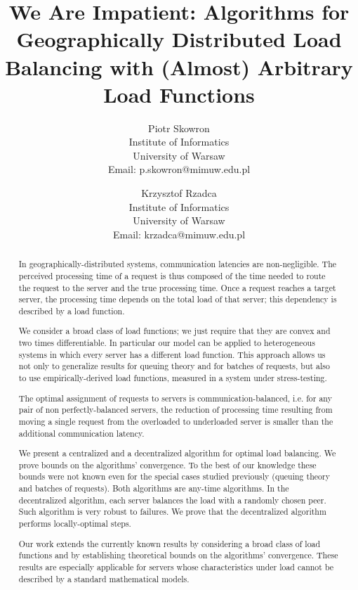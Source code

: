 \documentclass[11pt]{article}
\begin{document}
\title{We Are Impatient: Algorithms for Geographically Distributed Load Balancing with (Almost) Arbitrary Load Functions}

\author{Piotr Skowron \\
   Institute of Informatics \\
   University of Warsaw \\
   Email: p.skowron@mimuw.edu.pl \\
   \and
   Krzysztof Rzadca \\
   Institute of Informatics \\
   University of Warsaw \\
   Email: krzadca@mimuw.edu.pl}

\date{}

\maketitle

\begin{abstract}

In geographically-distributed systems, 
communication latencies are non-negligible.
The perceived processing time of a request is thus composed of the time needed to route the request to the server and the true processing time.
Once a request reaches a target server, the processing time depends on the total load of that server; this dependency is described by a load function.

We consider a broad class of load functions; we just require that they are convex and two times differentiable. In particular our model can be applied to heterogeneous systems in which every server has a different load function. This approach allows us not only to generalize results for queuing theory and for batches of requests, but also to use empirically-derived load functions, measured in a system under stress-testing.

The optimal assignment of requests to servers is communication-balanced, i.e. for any pair of non perfectly-balanced servers, the reduction of processing time resulting from moving a single request from the overloaded to underloaded server is smaller than the additional communication latency. 

We present a centralized and a decentralized algorithm for optimal load balancing.
We prove bounds on the algorithms' convergence. To the best of our knowledge these bounds were not known even for the special cases studied previously (queuing theory and batches of requests).
Both algorithms are any-time algorithms. 
In the decentralized algorithm, each server balances the load with a randomly chosen peer. Such algorithm is very robust to failures. We prove that the decentralized algorithm performs locally-optimal steps. 


Our work extends the currently known results by considering a broad class of load functions and by establishing theoretical bounds on the algorithms' convergence. These results are especially applicable for servers whose characteristics under load cannot be described by a standard mathematical models.




\end{abstract}
\end{document}
